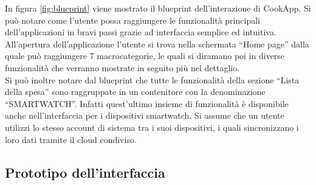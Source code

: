 In figura \ref{fig:blueprint} viene mostrato il blueprint dell'interazione
di CookApp. Si può notare come l'utente possa raggiungere le
funzionalità principali dell'applicazioni in bravi passi grazie ad
interfaccia semplice ed intuitiva. All'apertura dell'applicazione
l'utente si trova nella schermata ``Home page'' dalla quale può raggiungere 7
macrocategorie, le quali si diramano poi in diverse funzionalità che verranno
mostrate in seguito più nel dettaglio.\\
Si può inoltre notare dal blueprint che tutte le funzionalità della
sezione ``Lista della spesa''  sono raggruppate in un contenitore con la
denominazione ``SMARTWATCH''. Infatti quest'ultimo insieme di
funzionalità è disponibile anche nell'interfaccia per i dispositivi
smartwatch. Si assume che un utente utilizzi lo stesso account di
sistema tra i suoi dispositivi, i quali sincronizzano i loro dati
tramite il cloud condiviso.


\begin{landscape}
\label{fig:blueprint}
\begin{figure}[ht]
\centering
{}
\end{figure}
\end{landscape}


\subsection{Prototipo dell'interfaccia}
